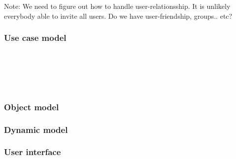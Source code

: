 			Note: We need to figure out how to handle user-relationsship. 
			It is unlikely everybody able to invite all users. Do we have user-friendship, groups.. etc?

		\subsubsection{Use case model}
			
			\begin{center}	
				\\
				\\
				\\
				\\
			\end{center}
		\subsubsection{Object model}
		\subsubsection{Dynamic model}
		\subsubsection{User interface}